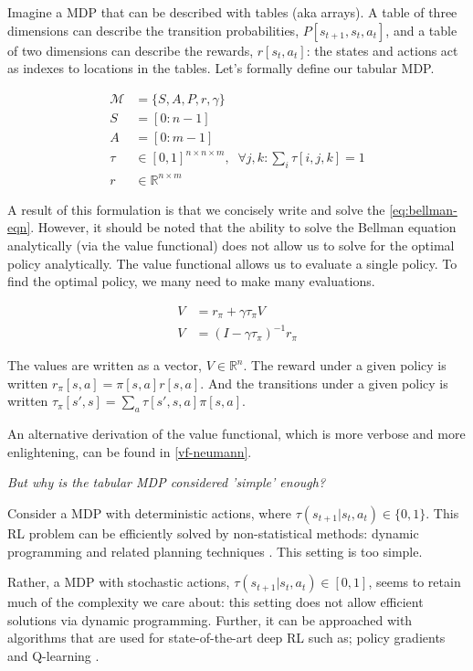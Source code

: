 Imagine a MDP that can be described with tables (aka arrays). A table of
three dimensions can describe the transition probabilities, $P[s_{t+1}, s_t, a_t]$,
and a table of two dimensions can describe the rewards, $r[s_t, a_t]$: the
states and actions act as indexes to locations in the tables.
Let's formally define our tabular MDP. \footnotemark


\begin{align*}
\mathcal M &= \{S, A, P, r, \gamma\}\; \tag{the MDP}\\
S &= [0:n-1] \tag{the state space}\\
A &= [0:m-1] \tag{the action space}\\
\tau &\in [0,1]^{n\times n \times m}, \;\;\forall j, k : \sum_i \tau[i, j, k] = 1 \tag{the transition fn.}\\
r &\in \mathbb R^{n\times m} \tag{the reward fn.}
\end{align*}

A result of this formulation is that we concisely write and solve the \eqref{eq:bellman-eqn}.
However, it should be noted that the ability to solve the Bellman equation analytically (via the value functional)
does not allow us to solve for the optimal policy analytically. The value functional allows us to evaluate a single policy.
To find the optimal policy, we many need to make many evaluations.

\begin{align*}
V &= r_{\pi} + \gamma \tau_{\pi} V \tag{tabular Bellman eqn}\\
V &= (I-\gamma \tau_{\pi})^{-1}r_{\pi}  \label{eq:value-functional}\tag{Value functional}
\end{align*}

The values are written as a vector, $V \in \mathbb R^n$.
The reward under a given policy is written $r_{\pi}[s, a] = \pi[s, a] r[s, a]$.
And the transitions under a given policy is written $\tau_{\pi}[s', s] = \sum_a \tau[s', s, a]\pi[s, a]$.

An alternative derivation of the value functional, which is more verbose and more enlightening, can be found in \ref{vf-neumann}.

\begin{displayquote}
\textsl{But why is the tabular MDP considered 'simple' enough?}
\end{displayquote}

Consider a MDP with deterministic actions, where $\tau(s_{t+1}|s_t, a_t) \in \{ 0, 1\}$.
This RL problem can be efficiently solved by non-statistical
methods: dynamic programming and related planning techniques \cite{Bertsekas1995}.
This setting is too simple.

Rather, a MDP with stochastic actions, $\tau(s_{t+1}|s_t, a_t) \in [0, 1]$,
seems to retain much of the complexity we care about: this setting does not allow
efficient solutions via dynamic programming. Further, it can be approached with algorithms
that are used for state-of-the-art deep RL such as;
policy gradients \cite{Schulman2015a} and Q-learning \cite{Mnih2015}.
